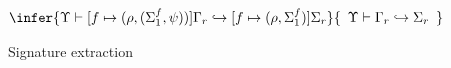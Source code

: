 \begin{figure}
{%
              \begin{equation} 
                \infer{\Upsilon\vdash[f\mapsto (\rho, (\Sigma^f_1,\psi))]\Gamma_r \hookrightarrow [f\mapsto (\rho,\Sigma^f_1)]\Sigma_r}
              {\begin{array}{c}
                 \Upsilon\vdash\Gamma_r\hookrightarrow\Sigma_r
              \end{array}} 
\label{eq:extrafct}
              \end{equation}



	}
\caption{Signature extraction}
\label{fig:extractsig}
\end{figure}